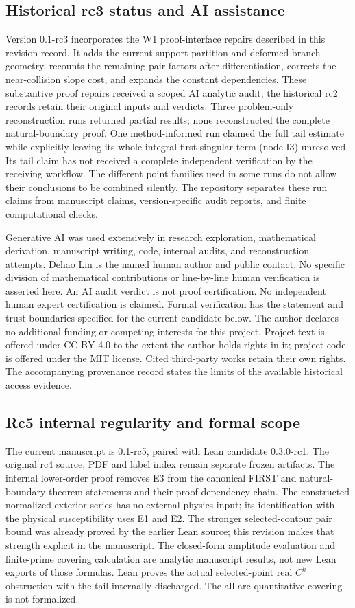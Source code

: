 \documentclass[11pt]{article}
\numberwithin{equation}{section}
\theoremstyle{definition}
\begin{document}
\subsection*{Historical rc3 status and AI assistance}
Version 0.1-rc3 incorporates the W1 proof-interface repairs described in this revision record.
It adds the current support partition and deformed branch geometry,
recounts the remaining pair factors after differentiation, corrects
the near-collision slope cost, and expands the constant dependencies.
These substantive proof repairs received a scoped AI analytic audit;
the historical rc2 records retain their original inputs and verdicts.
Three problem-only reconstruction runs returned partial results;
none reconstructed the complete natural-boundary proof. One
method-informed run claimed the full tail estimate while explicitly
leaving its whole-integral first singular term (node I3) unresolved.
Its tail claim has not received a complete independent verification
by the receiving workflow. The different point families used in
some runs do not allow their conclusions to be combined silently.
The repository separates these run claims from manuscript claims,
version-specific audit reports, and finite computational checks.

Generative AI was used extensively in research exploration,
mathematical derivation, manuscript writing, code, internal audits,
and reconstruction attempts. Dehao Lin is the named human author
and public contact. No specific division of mathematical contributions
or line-by-line human verification is asserted here.
An AI audit verdict is not proof certification. No independent human
expert certification is claimed. Formal verification has the statement
and trust boundaries specified for the current candidate below.
The author declares no additional funding or competing interests
for this project. Project text is offered under CC BY 4.0 to the extent
the author holds rights in it; project code is offered under the MIT
license. Cited third-party works retain their own rights.
The accompanying provenance record states
the limits of the available historical access evidence.

\subsection*{Rc5 internal regularity and formal scope}
The current manuscript is 0.1-rc5, paired with Lean candidate 0.3.0-rc1.
The original rc4 source, PDF and label index remain separate frozen
artifacts. The internal lower-order proof removes E3 from the canonical
FIRST and natural-boundary theorem statements and their proof dependency
chain. The constructed normalized exterior series has no external physics
input; its identification with the physical susceptibility uses E1 and E2.
The stronger selected-contour pair bound was already proved by the earlier
Lean source; this revision makes that strength explicit in the manuscript.
The closed-form amplitude evaluation and finite-prime covering calculation
are analytic manuscript results, not new Lean exports of those formulas.
Lean proves the actual selected-point real \(C^k\) obstruction with the tail
internally discharged. The all-arc quantitative covering is not formalized.
\end{document}
